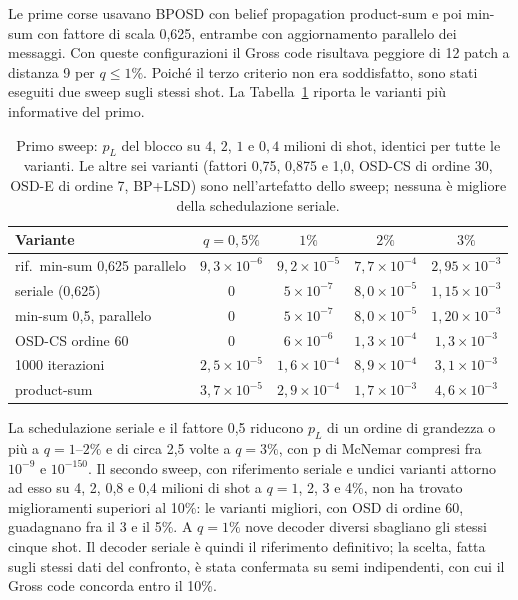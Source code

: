 \begin{onehalfspace}
Le prime corse usavano \ac{BPOSD} con belief propagation product-sum e
poi min-sum con fattore di scala 0,625, entrambe con aggiornamento
parallelo dei messaggi. Con queste configurazioni il Gross code
risultava peggiore di 12 patch a distanza 9 per $q \le 1\%$. Poiché il
terzo criterio non era soddisfatto, sono stati eseguiti due sweep sugli
stessi shot. La Tabella~\ref{tab:app_gross_sweep} riporta le varianti
più informative del primo.

\begin{table}[H]
\centering
\footnotesize
\begin{tabular}{@{}lcccc@{}}
\toprule
\textbf{Variante} & $q = 0{,}5\%$ & $1\%$ & $2\%$ & $3\%$ \\
\midrule
rif.\ min-sum 0,625 parallelo & $9{,}3\times10^{-6}$ & $9{,}2\times10^{-5}$ & $7{,}7\times10^{-4}$ & $2{,}95\times10^{-3}$ \\
seriale (0,625) & 0 & $5\times10^{-7}$ & $8{,}0\times10^{-5}$ & $1{,}15\times10^{-3}$ \\
min-sum 0,5, parallelo & 0 & $5\times10^{-7}$ & $8{,}0\times10^{-5}$ & $1{,}20\times10^{-3}$ \\
OSD-CS ordine 60 & 0 & $6\times10^{-6}$ & $1{,}3\times10^{-4}$ & $1{,}3\times10^{-3}$ \\
1000 iterazioni & $2{,}5\times10^{-5}$ & $1{,}6\times10^{-4}$ & $8{,}9\times10^{-4}$ & $3{,}1\times10^{-3}$ \\
product-sum & $3{,}7\times10^{-5}$ & $2{,}9\times10^{-4}$ & $1{,}7\times10^{-3}$ & $4{,}6\times10^{-3}$ \\
\bottomrule
\end{tabular}
\caption[Sweep del decoder sul Gross code]{Primo sweep: $p_L$ del
blocco su $4$, $2$, $1$ e $0{,}4$ milioni di shot, identici per tutte le
varianti. Le altre sei varianti (fattori 0,75, 0,875 e 1,0, OSD-CS di
ordine 30, OSD-E di ordine 7, BP+LSD) sono nell'artefatto dello sweep;
nessuna è migliore della schedulazione seriale.}
\label{tab:app_gross_sweep}
\end{table}

La schedulazione seriale e il fattore 0,5 riducono $p_L$ di un ordine di
grandezza o più a $q = 1$--$2\%$ e di circa 2,5 volte a $q = 3\%$, con p
di McNemar compresi fra $10^{-9}$ e $10^{-150}$. Il secondo sweep, con
riferimento seriale e undici varianti attorno ad esso su 4, 2, 0,8 e 0,4
milioni di shot a $q = 1$, 2, 3 e 4\%, non ha trovato miglioramenti
superiori al 10\%: le varianti migliori, con OSD di ordine 60, guadagnano
fra il 3 e il 5\%. A $q = 1\%$ nove decoder diversi sbagliano gli stessi
cinque shot. Il decoder seriale è quindi il riferimento definitivo; la
scelta, fatta sugli stessi dati del confronto, è stata confermata su semi
indipendenti, con cui il Gross code concorda entro il 10\%.


\end{onehalfspace}
